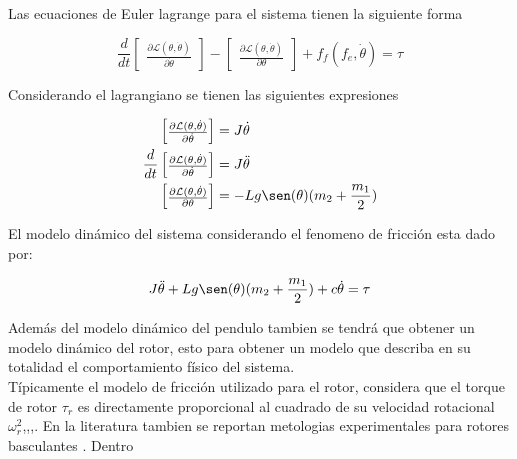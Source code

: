 \documentclass[a4paper]{IEEEtran} %
\begin{document}
Las ecuaciones de Euler lagrange para el sistema tienen la siguiente forma

\begin{equation}
    \frac{d}{dt}\begin{bmatrix}
        \frac{\partial \mathcal{L}(\theta,\dot{\theta})}{\partial\dot{\theta}}
    \end{bmatrix}-\begin{bmatrix}
        \frac{\partial \mathcal{L}(\theta,\dot{\theta})}{\partial \theta}
    \end{bmatrix}+f_f(f_e,\dot{\theta})=\tau
    \label{eq:eu_lagran}
\end{equation}

Considerando el lagrangiano se tienen las siguientes expresiones

\begin{equation}
    \begin{split}
        \begin{bmatrix}
            \frac{\partial \mathcal{L}(\theta,\dot{\theta})}{\partial\dot{\theta}}
        \end{bmatrix}&=J\dot{\theta}\\
        \frac{d}{dt}\begin{bmatrix}
            \frac{\partial\mathcal{L}(\theta,\dot{\theta})}{\partial\dot{\theta}}
        \end{bmatrix}&=J\ddot{\theta}\\
        \begin{bmatrix}
            \frac{\partial \mathcal{L}(\theta,\dot{\theta})}{\partial \theta}
        \end{bmatrix}&=-Lg\sen(\theta)(m_2 + \frac{m_1}{2})\\
    \end{split}
    \label{eq:dq}
\end{equation}

El modelo dinámico del sistema considerando el fenomeno de fricción esta dado por:

\begin{equation}
    J\ddot{\theta}+Lg\sen(\theta)(m_2+\frac{m_1}{2})+c\dot{\theta}=\tau
    \label{eq:din_model}
\end{equation}

Además del modelo dinámico del pendulo tambien se tendrá que obtener un modelo dinámico del rotor, esto para obtener un modelo que describa en su totalidad el comportamiento físico del sistema.
\\
Típicamente el modelo de fricción utilizado para el rotor, considera que el torque de rotor $\tau_r$ es directamente proporcional al cuadrado de su velocidad rotacional $\omega^2_r$\cite{nemati2014modeling},\cite{schulz2015high},\cite{koehl2012aerodynamic},\cite{mellinger2012trajectory}. En la literatura tambien se reportan metologias experimentales para rotores basculantes \cite{gill2017propeller}. Dentro





\end{document}
